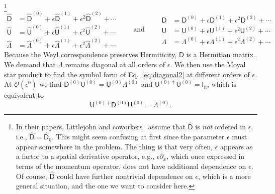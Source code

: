 \footnote{In their papers, Littlejohn and coworkers~\cite{littlejohn1991,weigert1993} assume that $\widehat{\mathsf{D}}$ is \emph{not} ordered in $\epsilon$, i.e., $\widehat{\mathsf{D}} = \widehat{\mathsf{D}}_{0}$.
  This might seem confusing at first since the parameter $\epsilon$ must appear somewhere in the problem.
  The thing is that very often, $\epsilon$ appears as a factor to a spatial derivative operator, e.g., $\epsilon\partial_{x}$, which once expressed in terms of the momentum operator, does not have additional dependence on $\epsilon$.
  Of course, $\widehat{\mathsf{D}}$ could have further nontrivial dependence on $\epsilon$, which is a more general situation, and the one we want to consider here.
}
%
\begin{equation}
  \begin{aligned}
    \widehat{\mathsf{D}} &= \widehat{\mathsf{D}}^{(0)} + \epsilon\widehat{\mathsf{D}}^{(1)} + \epsilon^{2}\widehat{\mathsf{D}}^{(2)} + \cdots\\
    \widehat{\mathsf{U}} &= \widehat{\mathsf{U}}^{(0)} + \epsilon\widehat{\mathsf{U}}^{(1)} + \epsilon^{2}\widehat{\mathsf{U}}^{(2)} + \cdots\\
    \widehat{\Lambda} &= \widehat{\Lambda}^{(0)} + \epsilon\widehat{\Lambda}^{(1)} + \epsilon^{2}\widehat{\Lambda}^{(2)} + \cdots
  \end{aligned}
  \qquad\text{and}\qquad
  \begin{aligned}
    {\mathsf{D}} &= {\mathsf{D}}^{(0)} + \epsilon{\mathsf{D}}^{(1)} + \epsilon^{2}{\mathsf{D}}^{(2)} + \cdots\\
    {\mathsf{U}} &= {\mathsf{U}}^{(0)} + \epsilon{\mathsf{U}}^{(1)} + \epsilon^{2}{\mathsf{U}}^{(2)} + \cdots\\
    {\Lambda} &= {\Lambda}^{(0)} + \epsilon{\Lambda}^{(1)} + \epsilon^{2}{\Lambda}^{(2)} + \cdots
  \end{aligned}
\end{equation}
%
Because the Weyl correspondence preserves Hermiticity, $\mathsf{D}$ is a Hermitian matrix.
We demand that $\Lambda$ remains diagonal at all orders of $\epsilon$.
We then use the Moyal star product to find the symbol form of Eq.~\eqref{eq:diagonal2} at different orders of $\epsilon$.
At $\mathcal{O}(\epsilon^0)$ we find $\mathsf{D}^{(0)}\mathsf{U}^{(0)} = \mathsf{U}^{(0)}\Lambda^{(0)}$ and $\mathsf{U}^{(0)\dagger}\mathsf{U}^{(0)} = \mathsf{I}_{n}$, which is equivalent to
%
\begin{equation}
  \mathsf{U}^{(0)\dagger}\mathsf{D}^{(0)}\mathsf{U}^{(0)} = \Lambda^{(0)}.\label{eq:omega0}
\end{equation}

